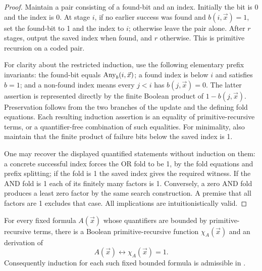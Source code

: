 \begin{proof}
Maintain a pair consisting of a found-bit and an index. Initially the bit is
0 and the index is 0. At stage \(i\), if no earlier success was found and
\(b(i,\vec x)=1\), set the found-bit to 1 and the index to \(i\); otherwise
leave the pair alone. After \(r\) stages, output the saved index when found,
and \(r\) otherwise. This is primitive recursion on a coded pair.

For clarity about the restricted induction, use the following elementary
prefix invariants: the found-bit equals \(\operatorname{Any}_b(i,\vec x)\); a found index
is below \(i\) and satisfies \(b=1\); and a non-found index means every
\(j<i\) has \(b(j,\vec x)=0\). The latter assertion is represented directly
by the finite Boolean product of \(1-b(j,\vec x)\). Preservation follows
from the two branches of the update and the defining fold equations. Each
resulting induction assertion is an equality of primitive-recursive terms,
or a quantifier-free combination of such equalities. For minimality, also
maintain that the finite product of failure bits below the saved index is 1.

One may recover the displayed quantified statements without induction on
them: a concrete successful index forces the OR fold to be 1, by the fold
equations and prefix splitting; if the fold is 1 the saved index gives the
required witness. If the AND fold is 1 each of its finitely many factors is
1. Conversely, a zero AND fold produces a least zero factor by the same
search construction. A premise that all factors are 1 excludes that case.
All implications are intuitionistically valid.
\end{proof}

\begin{theorem}
\label{thm:compile}
For every fixed formula \(A(\vec x)\) whose quantifiers are bounded by
primitive-recursive terms, there is a Boolean primitive-recursive function
\(\chi_A(\vec x)\) and an \ipra{} derivation of
\[
 A(\vec x)\leftrightarrow\chi_A(\vec x)=1.
\]
Consequently induction for each such fixed bounded formula is admissible in
\ipra.
\end{theorem}

